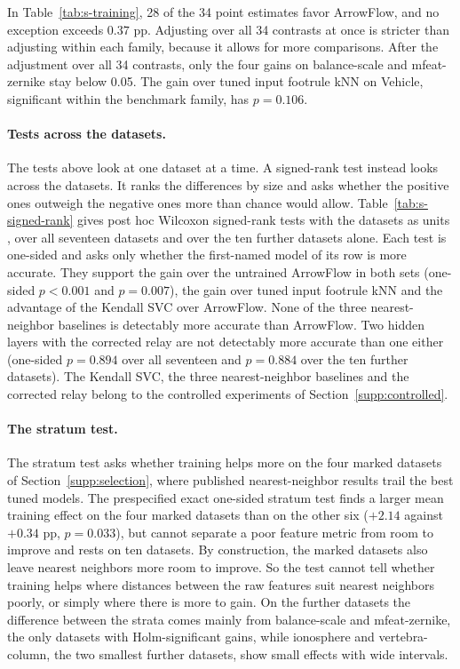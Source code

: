 In Table~\ref{tab:s-training}, 28 of the 34 point estimates favor ArrowFlow, and no exception exceeds $0.37$ pp. Adjusting over all 34 contrasts at once is stricter than adjusting within each family, because it allows for more comparisons. After the adjustment over all 34 contrasts, only the four gains on balance-scale and mfeat-zernike stay below 0.05. The gain over tuned input footrule kNN on Vehicle, significant within the benchmark family, has $p=0.106$.

\paragraph{Tests across the datasets.} The tests above look at one dataset at a time. A signed-rank test instead looks across the datasets. It ranks the differences by size and asks whether the positive ones outweigh the negative ones more than chance would allow. Table~\ref{tab:s-signed-rank} gives post hoc Wilcoxon signed-rank tests with the datasets as units \citep{demsar2006statistical}, over all seventeen datasets and over the ten further datasets alone. Each test is one-sided and asks only whether the first-named model of its row is more accurate. They support the gain over the untrained ArrowFlow in both sets (one-sided $p<0.001$ and $p=0.007$), the gain over tuned input footrule kNN and the advantage of the Kendall SVC over ArrowFlow. None of the three nearest-neighbor baselines is detectably more accurate than ArrowFlow. Two hidden layers with the corrected relay are not detectably more accurate than one either (one-sided $p=0.894$ over all seventeen and $p=0.884$ over the ten further datasets). The Kendall SVC, the three nearest-neighbor baselines and the corrected relay belong to the controlled experiments of Section~\ref{supp:controlled}.

\paragraph{The stratum test.} The stratum test asks whether training helps more on the four marked datasets of Section~\ref{supp:selection}, where published nearest-neighbor results trail the best tuned models. The prespecified exact one-sided stratum test finds a larger mean training effect on the four marked datasets than on the other six ($+2.14$ against $+0.34$ pp, $p=0.033$), but cannot separate a poor feature metric from room to improve and rests on ten datasets. By construction, the marked datasets also leave nearest neighbors more room to improve. So the test cannot tell whether training helps where distances between the raw features suit nearest neighbors poorly, or simply where there is more to gain. On the further datasets the difference between the strata comes mainly from balance-scale and mfeat-zernike, the only datasets with Holm-significant gains, while ionosphere and vertebra-column, the two smallest further datasets, show small effects with wide intervals.

